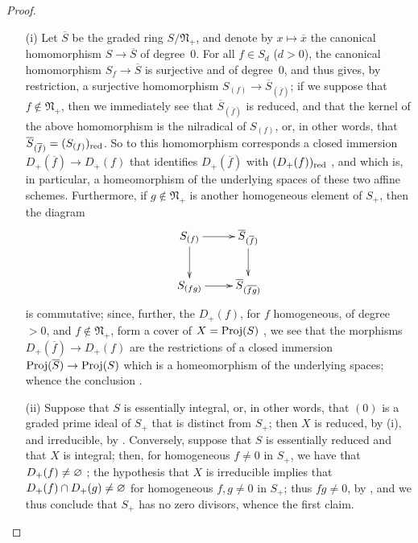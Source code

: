 \begin{proof}
\medskip\noindent
\begin{enumerate}
  \item[{\rm(i)}] Let $\overline{S}$ be the graded ring $S/\mathfrak{N}_+$, and denote by $x\mapsto\overline{x}$ the canonical homomorphism $S\to\overline{S}$ of degree~$0$.
    For all $f\in S_d$ ($d>0$), the canonical homomorphism $S_f\to\overline{S}$  is surjective and of degree~$0$, and thus gives, by restriction, a surjective homomorphism $S_{(f)}\to\overline{S}_{(\overline{f})}$;
    if we suppose that $f\not\in\mathfrak{N}_+$, then we immediately see that $\overline{S}_{(\overline{f})}$  is reduced, and that the kernel of the above homomorphism is the nilradical of $S_{(f)}$, or, in other words, that $\overline{S}_{(\overline{f})}=(S_{(f)})_{\mathrm{red}}$.
    So to this homomorphism corresponds a closed immersion $D_+(\overline{f})\to D_+(f)$ that identifies $D_+(\overline{f})$ with $(D_+(f))_{\mathrm{red}}$ , and which is, in particular, a homeomorphism of the underlying spaces of these two affine schemes.
    Furthermore, if $g\not\in\mathfrak{N}_+$ is another homogeneous element of $S_+$, then the diagram
    \[
      \xymatrix{
        S_{(f)} \ar[r] \ar[d]
        & \overline{S}_{(\overline{f})} \ar[d]
      \\S_{(fg)} \ar[r]
        & \overline{S}_{(\overline{fg})}
      }
    \]
    is commutative;
    since, further, the $D_+(f)$, for $f$ homogeneous, of degree $>0$, and $f\not\in\mathfrak{N}_+$, form a cover of $X=\operatorname{Proj}(S)$ , we see that the morphisms $D_+(\overline{f})\to D_+(f)$ are the restrictions of a closed immersion $\Proj(\overline{S})\to\Proj(S)$ which is a homeomorphism of the underlying spaces;
    whence the conclusion .
  \item[{\rm(ii)}] Suppose that $S$ is essentially integral, or, in other words, that $(0)$ is a graded prime ideal of $S_+$ that is distinct from $S_+$;
    then $X$ is reduced, by (i), and irreducible, by .
    Conversely, suppose that $S$ is essentially reduced and that $X$ is integral;
    then, for homogeneous $f\neq0$ in $S_+$, we have that $D_+(f)\neq\varnothing$ ;
    the hypothesis that $X$ is irreducible implies that $D_+(f)\cap D_+(g)\neq\varnothing$ for homogeneous $f,g\neq0$ in $S_+$;
    thus $fg\neq0$, by , and we thus conclude that $S_+$ has no zero divisors, whence the first claim.
\end{enumerate}
\end{proof}

